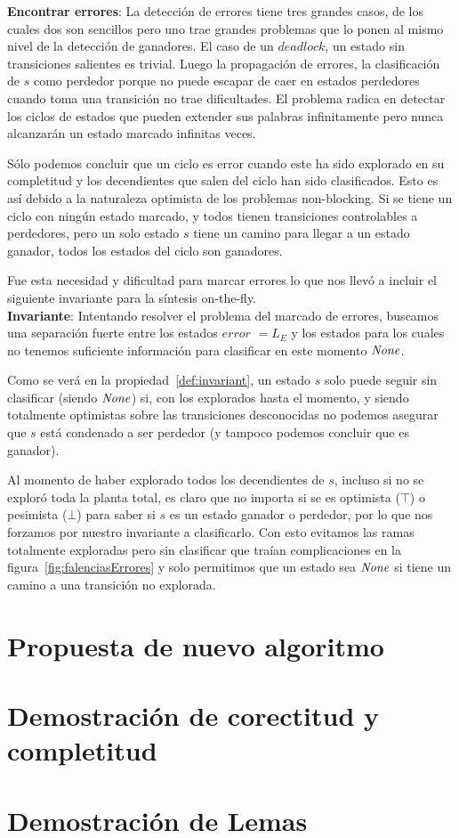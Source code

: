 \textbf{Encontrar errores}: La detección de errores tiene tres grandes casos, de los cuales dos son sencillos pero uno trae grandes problemas que lo ponen al mismo nivel de la detección de ganadores. El caso de un $deadlock$, un estado sin transiciones salientes es trivial. Luego la propagación de errores, la clasificación de $s$ como perdedor porque no puede escapar de caer en estados perdedores cuando toma una transición no trae dificultades. El problema radica en detectar los ciclos de estados que pueden extender sus palabras infinitamente pero nunca alcanzarán un estado marcado infinitas veces. 

Sólo podemos concluir que un ciclo es error cuando este ha sido explorado en su completitud y los decendientes que salen del ciclo han sido clasificados. Esto es así debido a la naturaleza optimista de los problemas non-blocking. Si se tiene un ciclo con ningún estado marcado, y todos tienen transiciones controlables a perdedores, pero un solo estado $s$ tiene un camino para llegar a un estado ganador, todos los estados del ciclo son ganadores. %

Fue esta necesidad y dificultad para marcar errores lo que nos llevó a incluir el siguiente invariante para la síntesis on-the-fly.\\

\textbf{Invariante}: Intentando resolver el problema del marcado de errores, buscamos una separación fuerte entre los estados $error$ $= L_E$ y los estados para los cuales no tenemos suficiente información para clasificar en este momento $\mathit{None}$.

Como se verá en la propiedad~\ref{def:invariant}, un estado $s$ solo puede seguir sin clasificar (siendo $\mathit{None}$) si, con los explorados hasta el momento, y siendo totalmente optimistas sobre las transiciones desconocidas no podemos asegurar que $s$ está condenado a ser perdedor (y tampoco podemos concluir que es ganador).

Al momento de haber explorado todos los decendientes de $s$, incluso si no se exploró toda la planta total, es claro que no importa si se es optimista ($\top$) o pesimista ($\bot$) para saber si $s$ es un estado ganador o perdedor, por lo que nos forzamos por nuestro invariante a clasificarlo. Con esto evitamos las ramas totalmente exploradas pero sin clasificar que traían complicaciones en la figura~\ref{fig:falenciasErrores} y solo permitimos que un estado sea $\mathit{None}$ si tiene un camino a una transición no explorada.

\section{Propuesta de nuevo algoritmo}



\FloatBarrier

\section{Demostración de corectitud y completitud}


\section{Demostración de Lemas}

